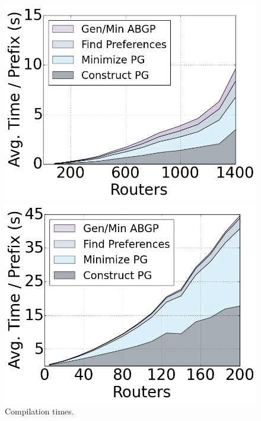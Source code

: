 \begin{figure}[t!]
  \centering
  \begin{minipage}[b]{0.45\linewidth}
    \includegraphics[width=1.1\columnwidth]{figures/compilation-times-dc.png}
  \end{minipage}
  \quad
  \begin{minipage}[b]{0.45\linewidth}
    \includegraphics[width=1.1\columnwidth]{figures/compilation-times-backbone.png}
  \end{minipage}
  \caption{Compilation times.}
  \label{fig:compilation-times}
\end{figure}

